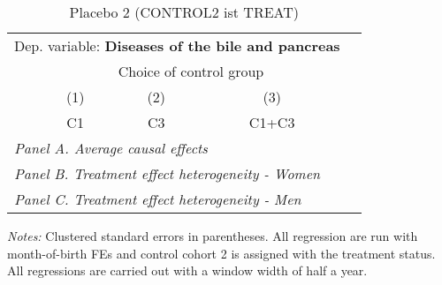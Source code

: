  \begin{table}[H] \centering \begin{threeparttable} \caption{Placebo 2 (CONTROL2 ist TREAT) } {\def\sym#1{\ifmmode^{#1}\else\(^{#1}\)\fi} \begin{tabular}{l*{4}{c}} \toprule \multicolumn{4}{l}{Dep. variable: \textbf{Diseases of the bile and pancreas}} \\ & \multicolumn{3}{c}{Choice of control group} \\ \cmidrule(lr){2-4}
            &\multicolumn{1}{c}{(1)}&\multicolumn{1}{c}{(2)}&\multicolumn{1}{c}{(3)}\\
            &\multicolumn{1}{c}{C1}&\multicolumn{1}{c}{C3}&\multicolumn{1}{c}{C1+C3}\\
\midrule
 \multicolumn{4}{l}{\emph{Panel A. Average causal effects}} \\      \midrule\multicolumn{4}{l}{\emph{Panel B. Treatment effect heterogeneity - Women}} \\      \midrule\multicolumn{4}{l}{\emph{Panel C. Treatment effect heterogeneity - Men}} \\      
\bottomrule \end{tabular} } \begin{tablenotes} \item \scriptsize \emph{Notes:} Clustered standard errors in parentheses. All regression are run with month-of-birth FEs and control cohort 2 is assigned with the treatment status. All regressions are carried out with a window width of half a year. \end{tablenotes} \end{threeparttable} \end{table} 
